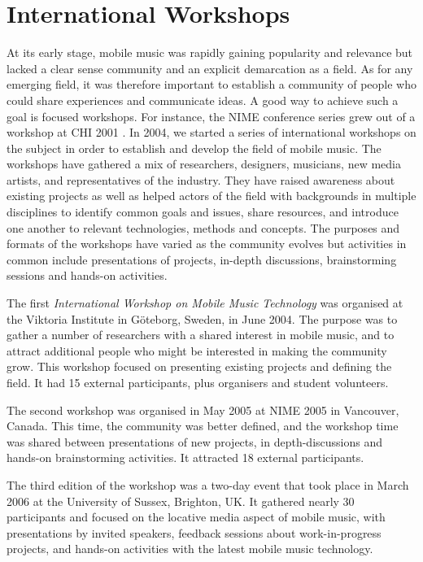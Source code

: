 \section{International Workshops}

At its early stage, mobile music was rapidly gaining popularity and relevance
but lacked a clear sense community and an explicit demarcation as a field. As for
any emerging field, it was therefore important to establish a community of people
who could share experiences and communicate ideas. A good way to achieve such a
goal is focused workshops. For instance, the NIME conference series grew out of a
workshop at CHI 2001 \cite{Poupyrev:2001a}. In 2004, we started a series of international
workshops on the subject in order to establish and develop the field of mobile
music. The workshops have gathered a mix of researchers, designers, musicians,
new media artists, and representatives of the industry. They have raised
awareness about existing projects as well as helped actors of the field with
backgrounds in multiple disciplines to identify common goals and issues, share
resources, and introduce one another to relevant technologies, methods and
concepts. The purposes and formats of the workshops have varied as the community
evolves but activities in common include presentations of projects, in-depth
discussions, brainstorming sessions and hands-on activities.

The first \textit{International Workshop on Mobile Music Technology }was
organised at the Viktoria Institute in G\"{o}teborg, Sweden, in June 2004. The
purpose was to gather a number of researchers with a shared interest in mobile
music, and to attract additional people who might be interested in making the
community grow. This workshop focused on presenting existing projects and
defining the field. It had 15 external participants, plus organisers and student
volunteers.

The second workshop was organised in May 2005 at NIME 2005 in Vancouver, Canada.
This time, the community was better defined, and the workshop time was shared
between presentations of new projects, in depth-discussions and hands-on
brainstorming activities. It attracted 18 external participants.

The third edition of the workshop was a two-day event that took place in March
2006 at the University of Sussex, Brighton, UK. It gathered nearly 30
participants and focused on the locative media aspect of mobile music, with
presentations by invited speakers, feedback sessions about work-in-progress
projects, and hands-on activities with the latest mobile music technology.

